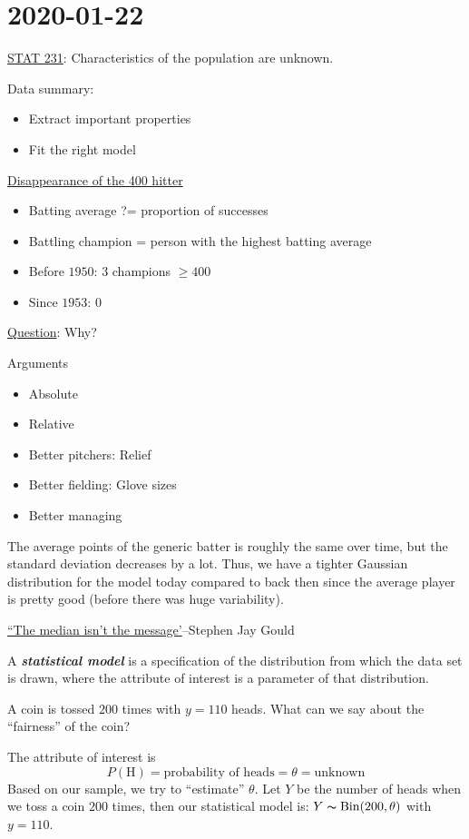 \section{2020-01-22}
\underline{STAT 231}: Characteristics of the population
are unknown.

Data summary:
\begin{itemize}
    \item Extract important properties
    \item Fit the right model
\end{itemize}

\underline{Disappearance of the 400 hitter}
\begin{itemize}
    \item Batting average ?= proportion of successes
    \item Battling champion = person with the highest batting average
    \item Before $ 1950 $: 3 champions $ \geqslant 400 $
    \item Since $ 1953 $: 0
\end{itemize}
\underline{Question}: Why?

Arguments
\begin{itemize}
    \item Absolute
    \item Relative
    \item Better pitchers: Relief
    \item Better fielding: Glove sizes
    \item Better managing
\end{itemize}
The average points of the generic batter is roughly the same over time,
but the standard deviation decreases by a lot. Thus, we have a tighter Gaussian
distribution for the model today compared to back then since the average
player is pretty good (before there was huge variability).

\underline{``The median isn't the message'}--Stephen Jay Gould

\begin{defbox}
    \begin{definition}
        A \textbf{\emph{statistical model}} is a specification of the
        distribution from which the data set is drawn, where the attribute of interest
        is a parameter of that distribution.
    \end{definition}
\end{defbox}

\begin{exbox}
    \begin{example}
        A coin is tossed $ 200 $ times with $ y=110 $ heads. What can we say
        about the ``fairness'' of the coin?

        The attribute of interest is
        \[ P(\text{H})=\text{probability of heads}=\theta=\text{unknown} \]
        Based on our sample, we try to ``estimate'' $ \theta $.
        Let $ Y $ be the number of heads when we toss a coin $ 200 $ times,
        then our statistical model is: $ Y \thicksim \operatorname{Bin}(200,\theta) $
        with $ y=110 $.
    \end{example}
\end{exbox}

